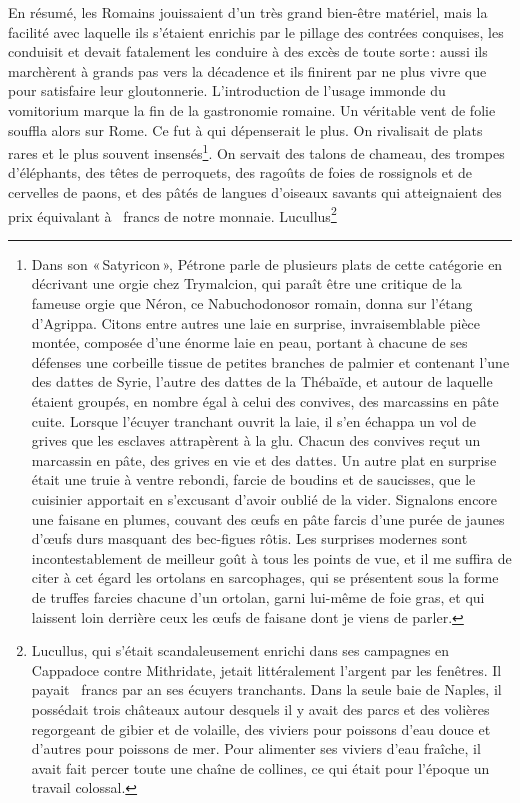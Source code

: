 En résumé, les Romains jouissaient d’un très grand bien-être matériel, mais la
facilité avec laquelle ils s'étaient enrichis par le pillage des contrées
conquises, les conduisit et devait fatalement les conduire à des excès de toute
sorte : aussi ils marchèrent à grands pas vers la décadence et ils finirent par
ne plus vivre que pour satisfaire leur gloutonnerie. L'introduction de l'usage
immonde du vomitorium marque la fin de la gastronomie romaine. Un véritable
vent de folie souffla alors sur Rome. Ce fut à qui dépenserait le plus. On
rivalisait de plats rares et le plus souvent insensés\footnote{Dans son
« Satyricon », Pétrone parle de plusieurs plats de cette catégorie en décrivant
une orgie chez Trymalcion, qui paraît être une critique de la fameuse orgie que
Néron, ce Nabuchodonosor romain, donna sur l'étang d'Agrippa. Citons entre
autres une laie en surprise, invraisemblable pièce montée, composée d'une
énorme laie en peau, portant à chacune de ses défenses une corbeille tissue de
petites branches de palmier et contenant l'une des dattes de Syrie, l'autre des
dattes de la Thébaïde, et autour de laquelle étaient groupés, en nombre égal
à celui des convives, des marcassins en pâte cuite. Lorsque l'écuyer tranchant
ouvrit la laie, il s'en échappa un vol de grives que les esclaves attrapèrent
à la glu. Chacun des convives reçut un marcassin en pâte, des grives en vie et
des dattes. Un autre plat en surprise était une truie à ventre rebondi, farcie
de boudins et de saucisses, que le cuisinier apportait en s'excusant d'avoir
oublié de la vider. Signalons encore une faisane en plumes, couvant des œufs en
pâte farcis d'une purée de jaunes d'œufs durs masquant des bec-figues rôtis.
Les surprises modernes sont incontestablement de meilleur goût à tous les
points de vue, et il me suffira de citer à cet égard les ortolans en
sarcophages, qui se présentent sous la forme de truffes farcies chacune d'un
ortolan, garni lui-même de foie gras, et qui laissent loin derrière ceux les
œufs de faisane dont je viens de parler.}. On servait des talons de chameau,
des trompes d'éléphants, des têtes de perroquets, des ragoûts de foies de
rossignols et de cervelles de paons, et des pâtés de langues d'oiseaux savants
qui atteignaient des prix équivalant à {\mmm} {\mmm} francs de
notre monnaie. Lucullus\footnote{Lucullus, qui s'était scandaleusement enrichi
dans ses campagnes en Cappadoce contre Mithridate, jetait littéralement
l’argent par les fenêtres. Il payait {\mmm} {\mmm} francs par an
ses écuyers tranchants. Dans la seule baie de Naples, il possédait trois
châteaux autour desquels il y avait des parcs et des volières regorgeant de
gibier et de volaille, des viviers pour poissons d'eau douce et d'autres pour
poissons de mer. Pour alimenter ses viviers d'eau fraîche, il avait fait percer
toute une chaîne de collines, ce qui était pour l’époque un travail colossal.}
